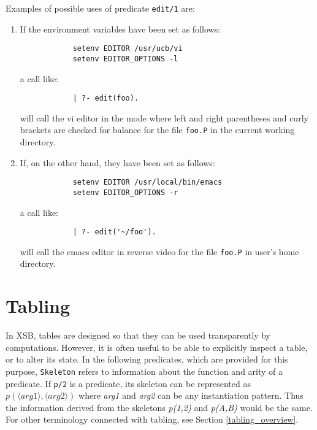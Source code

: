 \begin{description}
    Examples of possible uses of predicate {\tt edit/1} are:
    \begin{enumerate}
    \item If the environment variables have been set as follows:
          \begin{verbatim}
	        setenv EDITOR /usr/ucb/vi
	        setenv EDITOR_OPTIONS -l
          \end{verbatim}
          a call like:
          \begin{verbatim}
	        | ?- edit(foo).
          \end{verbatim}
          will call the vi editor in the mode where left and right parentheses
	  and curly brackets are checked for balance for the file {\tt foo.P}
	  in the current working directory.
    \item If, on the other hand, they have been set as follows:
          \begin{verbatim}
	        setenv EDITOR /usr/local/bin/emacs
	        setenv EDITOR_OPTIONS -r
          \end{verbatim}
          a call like:
          \begin{verbatim}
	        | ?- edit('~/foo').
          \end{verbatim}
          will call the emacs editor in reverse video for the file {\tt foo.P}
	  in user's home directory.
    \end{enumerate}

\end{description}



\section{Tabling} \label{tabling_predicates}

In XSB, tables are designed so that they can be used transparently by
computations.  However, it is often useful to be able to explicitly
inspect a table, or to alter its state.  In the following predicates,
which are provided for this purpose, {\tt Skeleton} refers to
information about the function and arity of a predicate.  If {\tt p/2}
is a predicate, its skeleton can be represented as {$p(\langle arg1
\rangle,\langle arg2 \rangle)$} where {\em arg1} and {\em arg2} can be
any instantiation pattern.  Thus the information derived from the
skeletons {\em p(1,2)} and {\em p(A,B)} would be the same.  For other
terminology connected with tabling, see Section
\ref{tabling_overview}.


